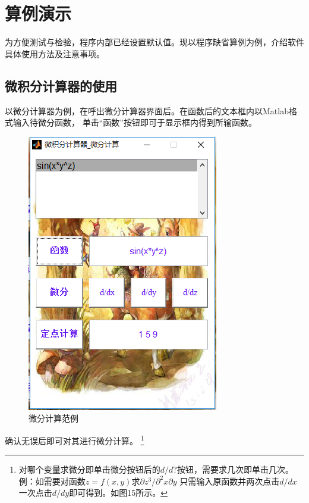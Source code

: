 \documentclass[UTF8]{ctexart}
\begin{document}
\section{算例演示}
为方便测试与检验，程序内部已经设置默认值。现以程序缺省算例为例，介绍软件具体使用方法及注意事项。
\subsection{微积分计算器的使用}
以微分计算器为例，在呼出微分计算器界面后。在函数后的文本框内以Matlab格式输入待微分函数，
单击“函数”按钮即可于显示框内得到所输函数。
\begin{figure}[H]
\centering
\includegraphics[scale=0.4]{image/pic08.png}
\caption{微分计算范例}
\label{fig:pic08}
\end{figure}
确认无误后即可对其进行微分计算。
\footnote{对哪个变量求微分即单击微分按钮后的$d/d$?按钮，需要求几次即单击几次。
例：如需要对函数$z=f(x,y)$求$ \partial z^3 /\partial^2 x \partial y$ 
只需输入原函数并两次点击$d/dx$一次点击$d/dy$即可得到。如图15所示。}
\end{document}
